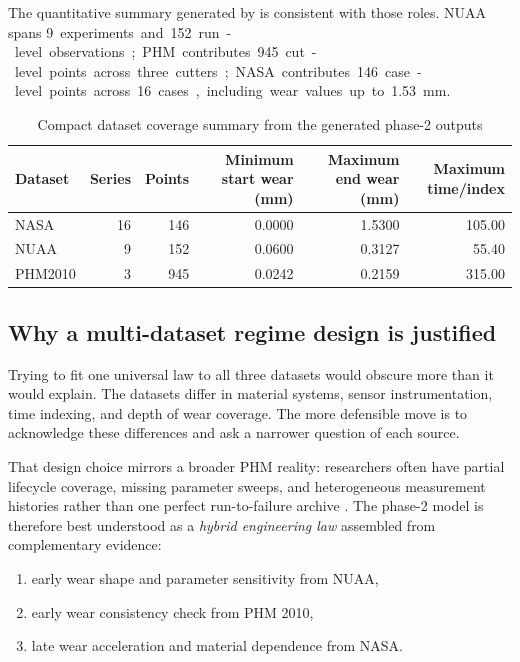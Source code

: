\documentclass[11pt,a4paper]{article}
\begin{document}
The quantitative summary generated by  is consistent with those roles.
NUAA spans \SI{9} experiments and \SI{152} run-level observations; PHM contributes \SI{945} cut-level points across
three cutters; NASA contributes \SI{146} case-level points across \SI{16} cases, including wear values up to
\SI{1.53}{mm}.

\begin{table}[H]
\centering
\caption{Compact dataset coverage summary from the generated phase-2 outputs}
\begin{tabular}{lrrrrr}
\toprule
Dataset & Series & Points & Minimum start wear (mm) & Maximum end wear (mm) & Maximum time/index \\
\midrule
NASA & 16 & 146 & 0.0000 & 1.5300 & 105.00 \\
NUAA & 9 & 152 & 0.0600 & 0.3127 & 55.40 \\
PHM2010 & 3 & 945 & 0.0242 & 0.2159 & 315.00 \\
\bottomrule
\end{tabular}
\end{table}

\subsection{Why a multi-dataset regime design is justified}

Trying to fit one universal law to all three datasets would obscure more than it would explain.
The datasets differ in material systems, sensor instrumentation, time indexing, and depth of wear coverage.
The more defensible move is to acknowledge these differences and ask a narrower question of each source.

That design choice mirrors a broader PHM reality: researchers often have partial lifecycle coverage, missing
parameter sweeps, and heterogeneous measurement histories rather than one perfect run-to-failure archive
\cite{hagmeyer2021datasets}. The phase-2 model is therefore best understood as a \emph{hybrid engineering law}
assembled from complementary evidence:

\begin{enumerate}[leftmargin=1.8em]
\item early wear shape and parameter sensitivity from NUAA,
\item early wear consistency check from PHM 2010,
\item late wear acceleration and material dependence from NASA.
\end{enumerate}
\end{document}
